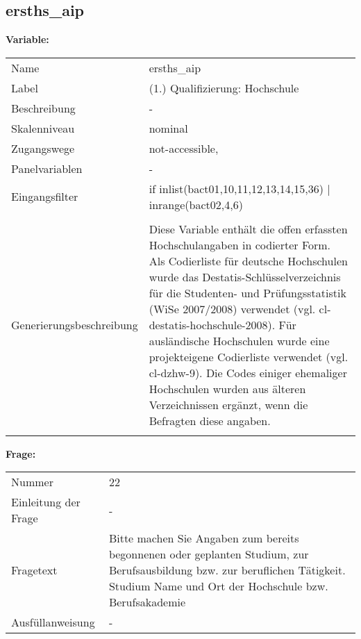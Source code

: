 	
	
	\subsection{ersths\_aip}
	\label{subSection:ersths_aip}

	\noindent\textbf{Variable:}\\
		\begin{tabular}{lL{11.3cm}}
			\label{tableVariable:ersths_aip}
			Name & ersths\_aip \\
			Label & (1.) Qualifizierung: Hochschule \\
			Beschreibung & - \\
			Skalenniveau & nominal \\
			Zugangswege &
				not-accessible,
 \\
			Panelvariablen & -
			 \\
			Eingangsfilter & if inlist(bact01,10,11,12,13,14,15,36) | inrange(bact02,4,6)  \\
 \\
					Generierungsbeschreibung & Diese Variable enthält die offen erfassten Hochschulangaben in codierter Form. Als Codierliste für deutsche Hochschulen wurde das Destatis-Schlüsselverzeichnis für die Studenten- und Prüfungsstatistik (WiSe 2007/2008) verwendet (vgl. cl-destatis-hochschule-2008). Für ausländische Hochschulen wurde eine projekteigene Codierliste verwendet (vgl. cl-dzhw-9). Die Codes einiger ehemaliger Hochschulen wurden aus älteren Verzeichnissen ergänzt, wenn die Befragten diese angaben.

				 \\	
			 \\
		\end{tabular}

		\vspace*{1 cm}
		\noindent\textbf{Frage:}\\
		\begin{tabular}{lL{11.3cm}}
			\label{tableQuestion:ersths_aip}
			Nummer & 22 \\
			Einleitung der Frage & - \\
			Fragetext & Bitte machen Sie Angaben zum bereits begonnenen oder geplanten Studium, zur Berufsausbildung bzw. zur beruflichen Tätigkeit.
Studium
Name und Ort der Hochschule bzw. Berufsakademie \\
			Ausfüllanweisung & - \\
		\end{tabular}





	
	\newpage
